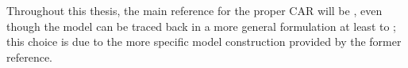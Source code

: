 \documentclass[openany, 11pt, oneside]{book}
\begin{document}
Throughout this thesis, the main reference for the proper CAR will be \cite{PCAR_Gelfand}, even though the model can be traced back in a more general formulation at least to \cite{Cressie1993}; this choice is due to the more specific model construction provided by the former reference.
\end{document}
